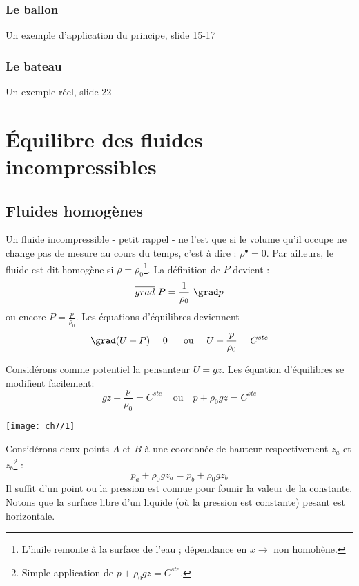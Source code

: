 	    \subsubsection{Le ballon}
	    Un exemple d'application du principe, slide 15-17
	    
	    \subsubsection{Le bateau}
	    Un exemple réel, slide 22
	    

\section{Équilibre des fluides incompressibles}
	\subsection{Fluides homogènes}
	Un fluide incompressible - petit rappel - ne l'est que si le volume qu'il occupe
	ne change pas de mesure au cours du temps, c'est à dire : $\rho^\bullet = 0$. Par 
	ailleurs, le fluide est dit homogène si $\rho = \rho_0$\footnote{L'huile remonte 
	à la surface de l'eau ; dépendance en $x \rightarrow$ non homohène.}. La 
	définition de $P$ 	devient :
	\begin{equation}
	\overline{grad}\ P = \frac{1}{\rho_0}\ \grad p
	\end{equation}
	ou encore $P = \frac{p}{\rho_0}$. Les équations d'équilibres deviennent
	\begin{equation}
	\grad (U + P) = 0\ \ \ \ \ \text{ou }\ \ \ U + \frac{p}{\rho_0} = C^{ste}
	\end{equation}
	
	Considérons comme potentiel la pensanteur $U = gz$. Les équation d'équilibres se
	modifient facilement:
	\begin{equation}
	gz + \frac{p}{\rho_0} = C^{ste}\ \ \ \ \ \text{ou }\ \ \ p+\rho_0gz = C^{ste}
	\end{equation}
\begin{center}
\texttt{[image: ch7/1]}
\end{center}
	
	Considérons deux points $A$ et $B$ à une coordonée de hauteur respectivement 
	$z_a$ et $z_b$\footnote{Simple application de $p+\rho_0gz = C^{ste}$.} :
	\begin{equation}
	p_a +\rho_0 gz_a = p_b +\rho_0gz_b
	\end{equation}
	Il suffit d'un point ou la pression est connue pour founir la valeur de la 
	constante. Notons que la surface libre d'un liquide (où la pression est 
	constante) pesant est horizontale.
	
